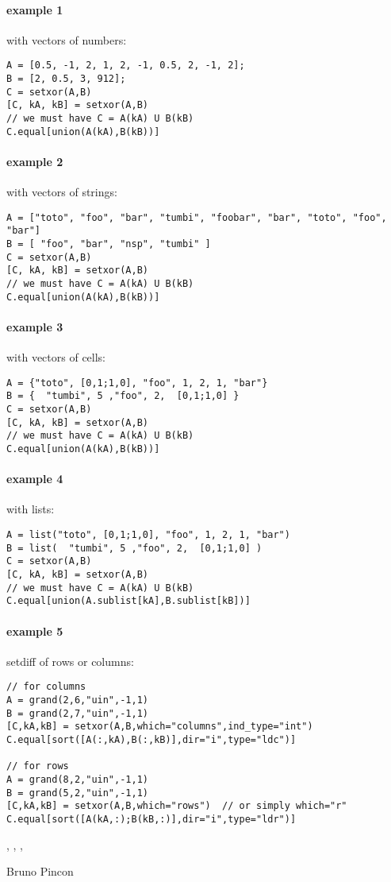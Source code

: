 \begin{examples}

\paragraph{example 1} with vectors of numbers:
\begin{Verbatim}
A = [0.5, -1, 2, 1, 2, -1, 0.5, 2, -1, 2];
B = [2, 0.5, 3, 912];
C = setxor(A,B)
[C, kA, kB] = setxor(A,B)
// we must have C = A(kA) U B(kB) 
C.equal[union(A(kA),B(kB))]
\end{Verbatim}

\paragraph{example 2} with vectors of strings:
\begin{Verbatim}
A = ["toto", "foo", "bar", "tumbi", "foobar", "bar", "toto", "foo", "bar"]
B = [ "foo", "bar", "nsp", "tumbi" ]
C = setxor(A,B)
[C, kA, kB] = setxor(A,B)
// we must have C = A(kA) U B(kB) 
C.equal[union(A(kA),B(kB))]
\end{Verbatim}

\paragraph{example 3} with vectors of cells:
\begin{Verbatim}
A = {"toto", [0,1;1,0], "foo", 1, 2, 1, "bar"}
B = {  "tumbi", 5 ,"foo", 2,  [0,1;1,0] }
C = setxor(A,B)
[C, kA, kB] = setxor(A,B)
// we must have C = A(kA) U B(kB) 
C.equal[union(A(kA),B(kB))]
\end{Verbatim}

\paragraph{example 4} with lists:
\begin{Verbatim}
A = list("toto", [0,1;1,0], "foo", 1, 2, 1, "bar")
B = list(  "tumbi", 5 ,"foo", 2,  [0,1;1,0] )
C = setxor(A,B)
[C, kA, kB] = setxor(A,B)
// we must have C = A(kA) U B(kB) 
C.equal[union(A.sublist[kA],B.sublist[kB])]
\end{Verbatim}

\paragraph{example 5} setdiff of rows or columns:
\begin{Verbatim}
// for columns
A = grand(2,6,"uin",-1,1)
B = grand(2,7,"uin",-1,1)
[C,kA,kB] = setxor(A,B,which="columns",ind_type="int")
C.equal[sort([A(:,kA),B(:,kB)],dir="i",type="ldc")]

// for rows
A = grand(8,2,"uin",-1,1)
B = grand(5,2,"uin",-1,1)
[C,kA,kB] = setxor(A,B,which="rows")  // or simply which="r"
C.equal[sort([A(kA,:);B(kB,:)],dir="i",type="ldr")]

\end{Verbatim}

\end{examples}

\begin{manseealso}
  , , ,    
\end{manseealso}

\begin{authors}
  Bruno Pincon
\end{authors}
